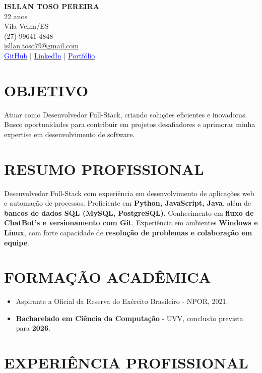 \documentclass[a4paper,10pt]{article}
\begin{document}
\begin{center}
    {\LARGE \textbf{ISLLAN TOSO PEREIRA}} \\
    22 anos \\
    Vila Velha/ES \\
    (27) 99641-4848 \\
    \href{mailto:isllan.toso79@gmail.com}{isllan.toso79@gmail.com} \\
    \href{https://github.com/Isllanrx}{\textcolor{blue}{GitHub}} | 
    \href{http://linkedin.com/in/isllantoso}{\textcolor{blue}{LinkedIn}} | 
    \href{https://dev-isllan.vercel.app/}{\textcolor{blue}{Portfólio}}
\end{center} 

\section{OBJETIVO}
Atuar como Desenvolvedor Full-Stack, criando soluções eficientes e inovadoras. Busco oportunidades para contribuir em projetos desafiadores e aprimorar minha expertise em desenvolvimento de software. 

\section{RESUMO PROFISSIONAL}
Desenvolvedor Full-Stack com experiência em desenvolvimento de aplicações web e automação de processos. Proficiente em \textbf{Python, JavaScript, Java}, além de \textbf{bancos de dados SQL (MySQL, PostgreSQL)}. Conhecimento em \textbf{fluxo de ChatBot’s e versionamento com Git}. Experiência em ambientes \textbf{Windows e Linux}, com forte capacidade de \textbf{resolução de problemas e colaboração em equipe}.

\section{FORMAÇÃO ACADÊMICA}
\begin{itemize}
    \item Aspirante a Oficial da Reserva do Exército Brasileiro - NPOR, 2021.
    \item \textbf{Bacharelado em Ciência da Computação} - UVV, conclusão prevista para \textbf{2026}.
\end{itemize}

\section{EXPERIÊNCIA PROFISSIONAL}
\end{document}
